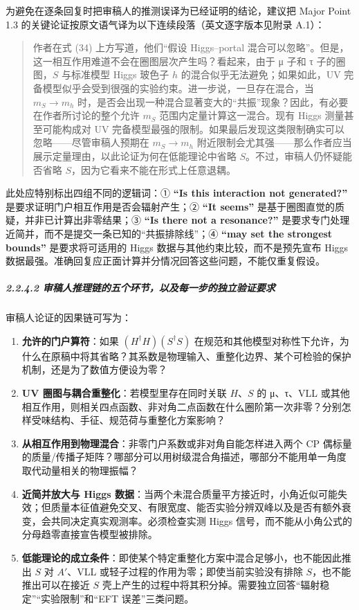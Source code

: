 \documentclass[
]{article}
\providecommand{\tightlist}{%
  \setlength{\itemsep}{0pt}\setlength{\parskip}{0pt}}
\begin{document}
为避免在逐条回复时把审稿人的推测误译为已经证明的结论，建议把 Major Point
1.3 的关键论证按原文语气译为以下连续段落（英文逐字版本见附录 A.1）：

\begin{quote}
作者在式 (34) 上方写道，他们``假设 Higgs--portal
混合可以忽略''。但是，这一相互作用难道不会在圈图层次产生吗？看起来，由于
μ 子和 τ 子的圈图，\(S\) 与标准模型 Higgs 玻色子 \(h\)
的混合似乎无法避免；如果如此，UV
完备模型似乎会受到很强的实验约束。进一步说，一旦存在混合，当
\(m_S\to m_h\)
时，是否会出现一种混合显著变大的``共振''现象？因此，有必要在作者所讨论的整个允许
\(m_S\) 范围内定量计算这一混合。现有 Higgs 测量甚至可能构成对 UV
完备模型最强的限制。如果最后发现这类限制确实可以忽略------尽管审稿人预期在
\(m_S\to m_h\)
附近限制会尤其强------那么作者应当展示定量理由，以此论证为何在低能理论中省略
\(S\)。不过，审稿人仍怀疑能否省略
\(S\)，因为它看来不能在形式上任意退耦。
\end{quote}

此处应特别标出四组不同的逻辑词：① \textbf{``Is this interaction not
generated?''} 是要求证明门户相互作用是否会辐射产生；② \textbf{``It
seems''} 是基于圈图直觉的质疑，并非已计算出非零结果；③ \textbf{``Is
there not a resonance?''}
是要求专门处理近简并，而不是提交一条已知的``共振排除线''；④
\textbf{``may set the strongest bounds''} 是要求将可适用的 Higgs
数据与其他约束比较，而不是预先宣布 Higgs
数据最强。准确回复应正面计算并分情况回答这些问题，不能仅重复假设。

\subparagraph{2.2.4.2
审稿人推理链的五个环节，以及每一步的独立验证要求}\label{ux5ba1ux7a3fux4ebaux63a8ux7406ux94feux7684ux4e94ux4e2aux73afux8282ux4ee5ux53caux6bcfux4e00ux6b65ux7684ux72ecux7acbux9a8cux8bc1ux8981ux6c42}

审稿人论证的因果链可写为：

\begin{enumerate}
\def\labelenumi{\arabic{enumi}.}
\tightlist
\item
  \textbf{允许的门户算符}：如果 \((H^\dagger H)(S^\dagger S)\)
  在规范和其他模型对称性下允许，为什么在原稿中将其省略？其系数是物理输入、重整化边界、某个可检验的保护机制，还是为了数值方便设为零？
\item
  \textbf{UV 圈图与耦合重整化}：若模型里存在同时关联 \(H\)、\(S\) 的
  μ、τ、VLL
  或其他相互作用，则相关四点函数、非对角二点函数在什么圈阶第一次非零？分别怎样受味结构、手征、规范荷与重整化方案影响？
\item
  \textbf{从相互作用到物理混合}：非零门户系数或非对角自能怎样进入两个 CP
  偶标量的质量/传播子矩阵？哪部分可以用树级混合角描述，哪部分不能用单一角度取代动量相关的物理振幅？
\item
  \textbf{近简并放大与 Higgs
  数据}：当两个未混合质量平方接近时，小角近似可能失效；但质量本征值避免交叉、有限宽度、能否实验分辨双峰以及是否有额外衰变，会共同决定真实观测率。必须检查实测
  Higgs 信号，而不能从小角公式的分母趋零直接宣告模型被排除。
\item
  \textbf{低能理论的成立条件}：即使某个特定重整化方案中混合足够小，也不能因此推出
  \(S\) 对 \(A'\)、VLL 或轻子过程的作用为零；即使当前实验没有排除
  \(S\)，也不能推出可以在接近 \(S\)
  壳上产生的过程中将其积分掉。需要独立回答``辐射稳定''``实验限制''和``EFT
  误差''三类问题。
\end{enumerate}
\end{document}
